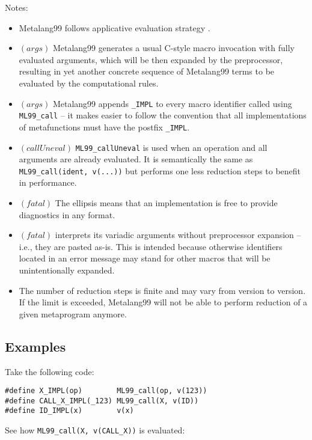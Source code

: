 \documentclass[12pt]{article}
\theoremstyle{break}
\begin{document}
Notes:

\begin{itemize}
    \item Metalang99 follows applicative evaluation strategy \cite{ApplicativeEvaluationStrategy}.

    \item $(args)$ Metalang99 generates a usual C-style macro invocation with
    fully evaluated arguments, which will be then expanded by the preprocessor, resulting
    in yet another concrete sequence of Metalang99 terms to be evaluated by the computational
    rules.
    \item $(args)$ Metalang99 appends \texttt{\_IMPL} to every macro identifier called using
    \texttt{ML99\_call} -- it makes easier to follow the convention that all implementations
    of metafunctions must have the postfix \texttt{\_IMPL}.
    \item $(callUneval)$ \texttt{ML99\_callUneval} is used when an operation and all
    arguments are already evaluated. It is semantically the same as \\ \texttt{ML99\_call(ident, v(...))}
    but performs one less reduction steps to benefit in performance.
    \item $(fatal)$ The ellipsis means that an implementation is free to provide
    diagnostics in any format.
    \item $(fatal)$ interprets its variadic arguments without preprocessor expansion -- i.e.,
    they are pasted as-is. This is intended because otherwise identifiers located in an
    error message may stand for other macros that will be unintentionally expanded.
    \item The number of reduction steps is finite and may vary from version to version. If
    the limit is exceeded, Metalang99 will not be able to perform reduction of a given
    metaprogram anymore.
\end{itemize}

\subsection{Examples}

Take the following code:

\begin{verbatim}
#define X_IMPL(op)        ML99_call(op, v(123))
#define CALL_X_IMPL(_123) ML99_call(X, v(ID))
#define ID_IMPL(x)        v(x)
\end{verbatim}

See how \texttt{ML99\_call(X, v(CALL\_X))} is evaluated:
\end{document}
